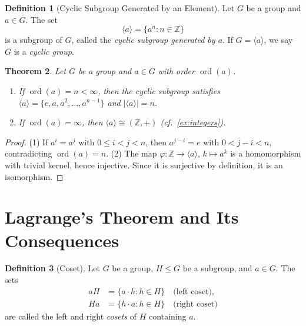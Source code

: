 \documentclass[12pt,a4paper]{article}
\theoremstyle{definition}
\newtheorem{definition}{Definition}[section]
\theoremstyle{plain}
\newtheorem{theorem}[definition]{Theorem}
\theoremstyle{remark}
\newcommand{\Z}{\mathbb{Z}}
\newcommand{\ord}{\operatorname{ord}}
\begin{document}
\begin{definition}[Cyclic Subgroup Generated by an Element]\label{def:cyclic-subgroup}
Let $G$ be a group and $a \in G$. The set
\begin{equation}\label{eq:generated}
    \langle a \rangle = \{a^n : n \in \Z\}
\end{equation}
is a subgroup of $G$, called the \emph{cyclic subgroup
generated by $a$}. If $G = \langle a \rangle$, we say $G$ is a \emph{cyclic group}.
\end{definition}

\begin{theorem}\label{thm:cyclic-subgroup-order}
Let $G$ be a group and $a \in G$ with order $\ord(a)$.
\begin{enumerate}
    \item If $\ord(a) = n < \infty$, then the cyclic subgroup
          satisfies $\langle a \rangle = \{e, a, a^2, \dots, a^{n-1}\}$
          and $|\langle a \rangle| = n$.
    \item If $\ord(a) = \infty$, then $\langle a \rangle \cong (\Z, +)$
          (cf.\ \cref{ex:integers}).
\end{enumerate}
\end{theorem}

\begin{proof}
(1) If $a^i = a^j$ with $0 \leq i < j < n$, then $a^{j-i} = e$ with $0 < j - i < n$,
contradicting $\ord(a) = n$.
(2) The map $\varphi \colon \Z \to \langle a \rangle$, $k \mapsto a^k$ is a
homomorphism with trivial kernel, hence injective.
Since it is surjective by definition, it is an isomorphism.
\end{proof}


\section{Lagrange's Theorem and Its Consequences}\label{sec:lagrange}

\begin{definition}[Coset]\label{def:coset}
Let $G$ be a group, $H \leq G$ be a subgroup, and $a \in G$.
The sets
\begin{align}
    aH &= \{a \cdot h : h \in H\}  \quad \text{(left coset)}, \label{eq:left-coset}\\
    Ha &= \{h \cdot a : h \in H\}  \quad \text{(right coset)} \label{eq:right-coset}
\end{align}
are called the left and right \emph{cosets} of $H$ containing $a$.
\end{definition}
\end{document}
